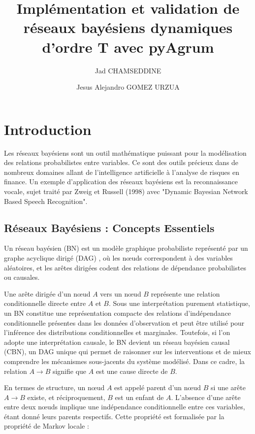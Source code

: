 \documentclass{article}
\title{Implémentation et validation de réseaux bayésiens dynamiques d'ordre T avec pyAgrum}
\author{Jad CHAMSEDDINE \and Jesus Alejandro GOMEZ URZUA}
\begin{document}
\maketitle

\section{Introduction}

Les réseaux bayésiens sont un outil mathématique puissant pour la modélisation des relations
probabilistes entre variables. Ce sont des outils précieux dans de nombreux domaines allant
de l'intelligence artificielle à l'analyse de risques en finance. Un exemple d'application des
réseaux bayésiens est la reconnaissance vocale, sujet traité par Zweig et Russell (1998) avec
"Dynamic Bayesian Network Based Speech Recognition"\cite{zweig1998speech}.

\subsection{Réseaux Bayésiens : Concepts Essentiels}

Un réseau bayésien (BN) est un modèle graphique probabiliste représenté par un graphe acyclique
dirigé (DAG) \cite{mihajlovic2001dynamic}, où les nœuds correspondent à des variables aléatoires,
et les arêtes dirigées codent des relations de dépendance probabilistes ou causales.

Une arête dirigée d'un nœud $A$ vers un nœud $B$ représente une relation conditionnelle directe
entre $A$ et $B$. Sous une interprétation purement statistique, un BN constitue une représentation
compacte des relations d'indépendance conditionnelle présentes dans les données d'observation et
peut être utilisé pour l’inférence des distributions conditionnelles et marginales. Toutefois, si
l'on adopte une interprétation causale, le BN devient un réseau bayésien causal (CBN), un DAG unique
qui permet de raisonner sur les interventions et de mieux comprendre les mécanismes sous-jacents du
système modélisé. Dans ce cadre, la relation $A \to B$ signifie que $A$ est une cause directe de $B$.

En termes de structure, un nœud $A$ est appelé parent d'un nœud $B$ si une arête $A \to B$ existe,
et réciproquement, $B$ est un enfant de $A$. L'absence d'une arête entre deux nœuds implique une
indépendance conditionnelle entre ces variables, étant donné leurs parents respectifs. Cette
propriété est formalisée par la propriété de Markov locale :
\end{document}
